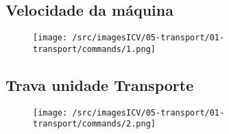 \thispagestyle{fancy}
\vspace{\fill}
\subsection{Velocidade da máquina}
\begin{figure}
    \centering
    \texttt{[image: /src/imagesICV/05-transport/01-transport/commands/1.png]}
\end{figure}

\newpage
\thispagestyle{fancy}
\vspace{\fill}
\subsection{Trava unidade Transporte}
\begin{figure}
    \centering
    \texttt{[image: /src/imagesICV/05-transport/01-transport/commands/2.png]}
\end{figure}